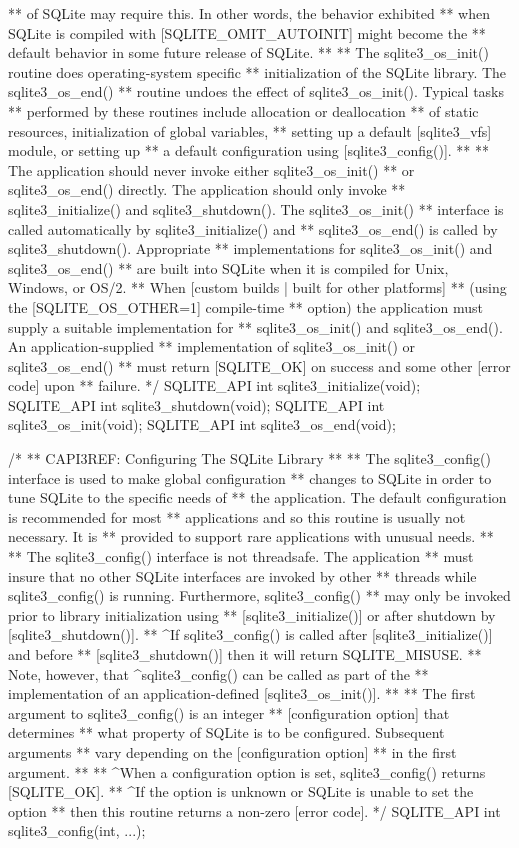 \begin{Codex}[label=sqlite3.h,numbers=left]
{** of SQLite may require this.  In other words, the behavior exhibited
** when SQLite is compiled with [SQLITE_OMIT_AUTOINIT] might become the
** default behavior in some future release of SQLite.
**
** The sqlite3_os_init() routine does operating-system specific
** initialization of the SQLite library.  The sqlite3_os_end()
** routine undoes the effect of sqlite3_os_init().  Typical tasks
** performed by these routines include allocation or deallocation
** of static resources, initialization of global variables,
** setting up a default [sqlite3_vfs] module, or setting up
** a default configuration using [sqlite3_config()].
**
** The application should never invoke either sqlite3_os_init()
** or sqlite3_os_end() directly.  The application should only invoke
** sqlite3_initialize() and sqlite3_shutdown().  The sqlite3_os_init()
** interface is called automatically by sqlite3_initialize() and
** sqlite3_os_end() is called by sqlite3_shutdown().  Appropriate
** implementations for sqlite3_os_init() and sqlite3_os_end()
** are built into SQLite when it is compiled for Unix, Windows, or OS/2.
** When [custom builds | built for other platforms]
** (using the [SQLITE_OS_OTHER=1] compile-time
** option) the application must supply a suitable implementation for
** sqlite3_os_init() and sqlite3_os_end().  An application-supplied
** implementation of sqlite3_os_init() or sqlite3_os_end()
** must return [SQLITE_OK] on success and some other [error code] upon
** failure.
*/
SQLITE_API int sqlite3_initialize(void);
SQLITE_API int sqlite3_shutdown(void);
SQLITE_API int sqlite3_os_init(void);
SQLITE_API int sqlite3_os_end(void);

/*
** CAPI3REF: Configuring The SQLite Library
**
** The sqlite3_config() interface is used to make global configuration
** changes to SQLite in order to tune SQLite to the specific needs of
** the application.  The default configuration is recommended for most
** applications and so this routine is usually not necessary.  It is
** provided to support rare applications with unusual needs.
**
** The sqlite3_config() interface is not threadsafe.  The application
** must insure that no other SQLite interfaces are invoked by other
** threads while sqlite3_config() is running.  Furthermore, sqlite3_config()
** may only be invoked prior to library initialization using
** [sqlite3_initialize()] or after shutdown by [sqlite3_shutdown()].
** ^If sqlite3_config() is called after [sqlite3_initialize()] and before
** [sqlite3_shutdown()] then it will return SQLITE_MISUSE.
** Note, however, that ^sqlite3_config() can be called as part of the
** implementation of an application-defined [sqlite3_os_init()].
**
** The first argument to sqlite3_config() is an integer
** [configuration option] that determines
** what property of SQLite is to be configured.  Subsequent arguments
** vary depending on the [configuration option]
** in the first argument.
**
** ^When a configuration option is set, sqlite3_config() returns [SQLITE_OK].
** ^If the option is unknown or SQLite is unable to set the option
** then this routine returns a non-zero [error code].
*/
SQLITE_API int sqlite3_config(int, ...);

}
\end{Codex}
